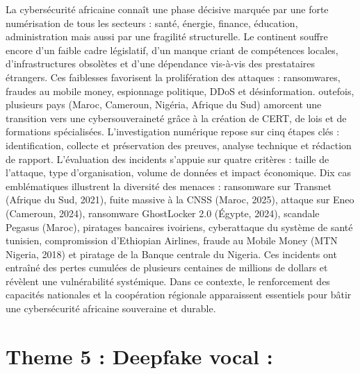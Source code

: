 \documentclass[12pt]{article}
\begin{document}
La cybersécurité africaine connaît une phase décisive marquée par une forte numérisation de tous les secteurs : santé, énergie, finance, éducation, administration mais aussi par une fragilité structurelle. Le continent souffre encore d’un faible cadre législatif, d’un manque criant de compétences locales, d’infrastructures obsolètes et d’une dépendance vis-à-vis des prestataires étrangers. Ces faiblesses favorisent la prolifération des attaques : ransomwares, fraudes au mobile money, espionnage politique, DDoS et désinformation. outefois, plusieurs pays (Maroc, Cameroun, Nigéria, Afrique du Sud) amorcent une transition vers une cybersouveraineté grâce à la création de CERT, de lois et de formations spécialisées.
L’investigation numérique repose sur cinq étapes clés : identification, collecte et préservation des preuves, analyse technique et rédaction de rapport. L’évaluation des incidents s’appuie sur quatre critères : taille de l’attaque, type d’organisation, volume de données et impact économique.
Dix cas emblématiques illustrent la diversité des menaces : ransomware sur Transnet (Afrique du Sud, 2021), fuite massive à la CNSS (Maroc, 2025), attaque sur Eneo (Cameroun, 2024), ransomware GhostLocker 2.0 (Égypte, 2024), scandale Pegasus (Maroc), piratages bancaires ivoiriens, cyberattaque du système de santé tunisien, compromission d’Ethiopian Airlines, fraude au Mobile Money (MTN Nigeria, 2018) et piratage de la Banque centrale du Nigeria. Ces incidents ont entraîné des pertes cumulées de plusieurs centaines de millions de dollars et révèlent une vulnérabilité systémique.
Dans ce contexte, le renforcement des capacités nationales et la coopération régionale apparaissent essentiels pour bâtir une cybersécurité africaine souveraine et durable.

    \section{Theme 5 : Deepfake vocal : }
\end{document}
